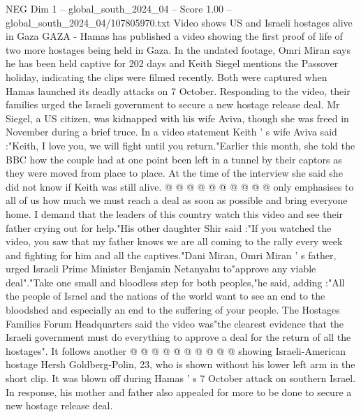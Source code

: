 \begin{textsample}{NEG Dim 1 – global\_south\_2024\_04 – Score 1.00 – global\_south\_2024\_04/107805970.txt}  \label{ex:f1_neg_305}
Video shows US and Israeli hostages alive in Gaza GAZA - Hamas has published a video showing the first proof of life of two more hostages being held in Gaza.
In the undated footage, Omri Miran says he has been held captive for 202 days and Keith Siegel mentions the Passover holiday, indicating the clips were filmed recently.
Both were captured when Hamas launched its deadly attacks on 7 October.
Responding to the video, their families urged the Israeli government to secure a new hostage release deal.
Mr Siegel, a US citizen, was kidnapped with his wife Aviva, though she was freed in November during a brief truce.
In a video statement Keith ' s wife Aviva said :"Keith, I love you, we will fight until you return."Earlier this month, she told the BBC how the couple had at one point been left in a tunnel by their captors as they were moved from place to place.
At the time of the interview she said she did not know if Keith was still alive. @ @ @ @ @ @ @ @ @ @ only emphasises to all of us how much we must reach a deal as soon as possible and bring everyone home.
I demand that the leaders of this country watch this video and see their father crying out for help."His other daughter Shir said :"If you watched the video, you saw that my father knows we are all coming to the rally every week and fighting for him and all the captives."Dani Miran, Omri Miran ' s father, urged Israeli Prime Minister Benjamin Netanyahu to"approve any viable deal"."Take one small and bloodless step for both peoples,"he said, adding :"All the people of Israel and the nations of the world want to see an end to the bloodshed and especially an end to the suffering of your people.
The Hostages Families Forum Headquarters said the video was"the clearest evidence that the Israeli government must do everything to approve a deal for the return of all the hostages".
It follows another @ @ @ @ @ @ @ @ @ @ showing Israeli-American hostage Hersh Goldberg-Polin, 23, who is shown without his lower left arm in the short clip.
It was blown off during Hamas ' s 7 October attack on southern Israel.
In response, his mother and father also appealed for more to be done to secure a new hostage release deal.

\end{textsample}
